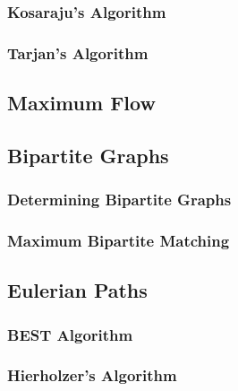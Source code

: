 \subsubsection{Kosaraju's Algorithm}
\subsubsection{Tarjan's Algorithm}
\subsection{Maximum Flow}
\subsection{Bipartite Graphs}
\subsubsection{Determining Bipartite Graphs}
\subsubsection{Maximum Bipartite Matching}
\subsection{Eulerian Paths}
\subsubsection{BEST Algorithm}
\subsubsection{Hierholzer's Algorithm}